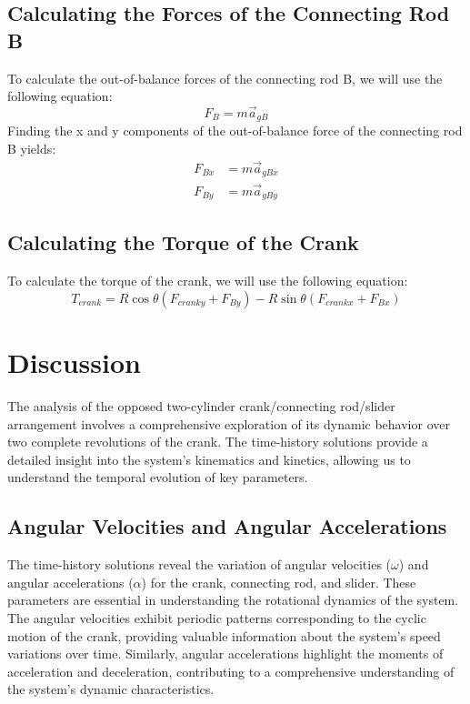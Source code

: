 \documentclass[12pt, titlepage]{article}
\begin{document}
\subsection{Calculating the Forces of the Connecting Rod B}
To calculate the out-of-balance forces of the connecting rod B, we will use the
following equation:
\begin{equation}
    \label{eq:connectingrodforce}
    F_{B} = m\vec{a}_{gB}
\end{equation}
Finding the x and y components of the out-of-balance force of the connecting
rod B yields:
\begin{equation}
    \label{eq:connectingrodforcexy}
    \begin{split}
      F_{Bx} &= m\vec{a}_{gBx}\\
      F_{By} &= m\vec{a}_{gBy}
    \end{split}
\end{equation}
\subsection{Calculating the Torque of the Crank}
To calculate the torque of the crank, we will use the following equation:
\begin{equation}
    \label{eq:cranktorque}
    T_{crank} = R\cos\theta (F_{cranky} + F_{By}) - 
    R\sin\theta (F_{crankx} + F_{Bx})
\end{equation}
\newpage
\section{Discussion}
The analysis of the opposed two-cylinder crank/connecting rod/slider
arrangement involves a comprehensive exploration of its dynamic behavior over
two complete revolutions of the crank. The time-history solutions provide a
detailed insight into the system's kinematics and kinetics, allowing us to
understand the temporal evolution of key parameters.

\subsection{Angular Velocities and Angular Accelerations}

The time-history solutions reveal the variation of angular velocities
($\omega$) and angular accelerations ($\alpha$) for the crank, connecting rod,
and slider. These parameters are essential in understanding the rotational
dynamics of the system. The angular velocities exhibit periodic patterns
corresponding to the cyclic motion of the crank, providing valuable information
about the system's speed variations over time. Similarly, angular accelerations
highlight the moments of acceleration and deceleration, contributing to a
comprehensive understanding of the system's dynamic characteristics.
\end{document}
